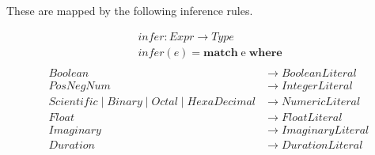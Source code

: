 \documentclass{article}
\begin{document}
These are mapped by the following inference rules.

\begin{align*}
    &infer : Expr \rightarrow Type \\
    &infer(e) = \textbf{match} \; \text{e} \;  \textbf{where} \\
\end{align*}
\vspace{-10mm}
\begin{align*}
    \;\; Boolean &\rightarrow BooleanLiteral \\
    \;\; PosNegNum &\rightarrow IntegerLiteral \\
    \;\; Scientific \; | \; Binary \; | \; Octal \; | \; HexaDecimal &\rightarrow NumericLiteral \\
    \;\; Float &\rightarrow FloatLiteral \\ 
    \;\; Imaginary &\rightarrow ImaginaryLiteral \\ 
    \;\; Duration &\rightarrow DurationLiteral
\end{align*}



\end{document}
